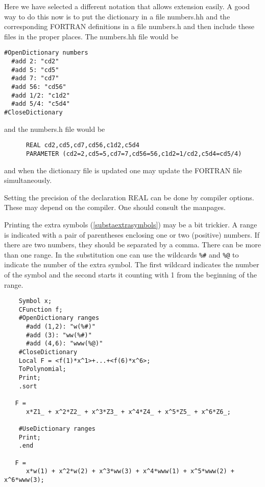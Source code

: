 Here we have selected a different notation that allows extension easily. 
A good way to do this now is to put the dictionary in a file numbers.hh and 
the corresponding FORTRAN definitions in a file numbers.h and then include 
these files in the proper places. The numbers.hh file would be
\begin{verbatim}
#OpenDictionary numbers
  #add 2: "cd2"
  #add 5: "cd5"
  #add 7: "cd7"
  #add 56: "cd56"
  #add 1/2: "c1d2"
  #add 5/4: "c5d4"
#CloseDictionary
\end{verbatim}
and the numbers.h file would be
\begin{verbatim}
      REAL cd2,cd5,cd7,cd56,c1d2,c5d4
      PARAMETER (cd2=2,cd5=5,cd7=7,cd56=56,c1d2=1/cd2,c5d4=cd5/4)
\end{verbatim}
and when the dictionary file is updated one may update the FORTRAN file 
simultaneously.

Setting the precision of the declaration REAL can be done by 
compiler options. These may depend on the compiler. One should consult the 
manpages.

Printing the extra symbols (\ref{substaextrasymbols}) 
may be a bit trickier. A range is indicated with 
a pair of parentheses enclosing one or two (positive) numbers. If there are 
two numbers, they should be separated by a comma. There can be more than 
one range. In the substitution one can use the wildcards \verb:%#: and 
\verb:%@: to indicate the number of the extra symbol. The first 
wildcard indicates the number of the symbol and the second starts it 
counting with 1 from the beginning of the range.
\begin{verbatim}
    Symbol x;
    CFunction f;
    #OpenDictionary ranges
      #add (1,2): "w(%#)"
      #add (3): "ww(%#)"
      #add (4,6): "www(%@)"
    #CloseDictionary
    Local F = <f(1)*x^1>+...+<f(6)*x^6>;
    ToPolynomial;
    Print;
    .sort

   F =
      x*Z1_ + x^2*Z2_ + x^3*Z3_ + x^4*Z4_ + x^5*Z5_ + x^6*Z6_;

    #UseDictionary ranges
    Print;
    .end

   F =
      x*w(1) + x^2*w(2) + x^3*ww(3) + x^4*www(1) + x^5*www(2) + x^6*www(3);
\end{verbatim}

